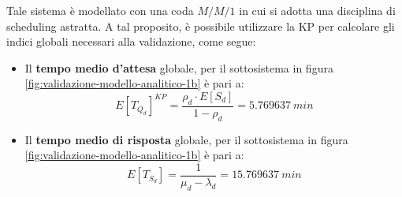 Tale sistema è modellato con una coda $M/M/1$ in cui si adotta una disciplina di scheduling astratta. A tal proposito, è possibile utilizzare la KP per calcolare gli indici globali necessari alla validazione, come segue:
\begin{itemize}
\item Il \textbf{tempo medio d'attesa} globale, per il sottosistema in figura \ref{fig:validazione-modello-analitico-1b} è pari a:
\begin{equation}
\label{eqn:validazione-24}
E[T_{Q_d}]^{KP} = \frac{\rho_d \cdot E[S_d]}{1-\rho_d} = 5.769637\ min
\end{equation}
\item Il \textbf{tempo medio di risposta} globale, per il sottosistema in figura \ref{fig:validazione-modello-analitico-1b} è pari a:
\begin{equation}
\label{eqn:validazione-26}
E[T_{S_d}] = \frac{1}{\mu_d - \lambda_d} = 15.769637\ min
\end{equation}
\end{itemize}


